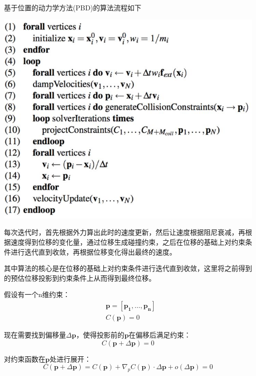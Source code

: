 \documentclass{CLGPY}
\begin{document}
\begin{multicols}{2}
		基于位置的动力学方法(PBD)的算法流程如下
        \begin{center}
            \includegraphics[width=1.0\linewidth]{./fig/PBD算法.jpg}
        \end{center}

		每次迭代时，首先根据外力算出此时的速度更新，然后让速度根据阻尼衰减，再根据速度得到位移的变化量，通过位移生成碰撞约束，之后在位移的基础上对约束条件进行迭代直到收敛，再根据位移变化得出最终的速度。

		其中算法的核心是在位移的基础上对约束条件进行迭代直到收敛，这里将之前得到的预估位移投影到约束条件上从而得到最终位移。

		假设有一个n维约束：
		\begin{equation}
		\begin{split}
			&\pmb{p} = [\pmb{p_1},…,\pmb{p_n}]\\
			&C(\pmb{p}) = 0
		\end{split}
		\end{equation}

		现在需要找到偏移量$\Delta \pmb{p}$，使得投影前的$\pmb{p}$在偏移后满足约束：
        \begin{equation}
			C(\pmb{p}+\Delta \pmb{p})=0
        \end{equation}

		对约束函数在$\pmb{p}$处进行展开：
        \begin{equation}
			C(\pmb{p}+\Delta \pmb{p}) = C(\pmb{p}) + \nabla_pC(\pmb{p}) \cdot \Delta \pmb{p} +o(\Delta \pmb{p}) =0
        \end{equation}


\end{multicols}
\end{document}
